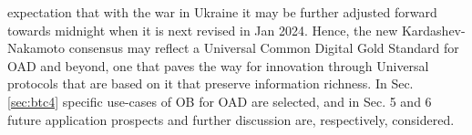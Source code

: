 \documentclass[final,5p,times,twocolumn,authoryear]{elsarticle}
\begin{document}
expectation that with the war in Ukraine it may be further adjusted forward towards midnight when it is next revised in Jan 2024. Hence, the new Kardashev-Nakamoto consensus may reflect a Universal Common Digital Gold Standard for OAD and beyond, one that paves the way for innovation through Universal protocols that are based on it that preserve information richness.  In Sec. \ref{sec:btc4} specific use-cases of OB for OAD are selected, and in Sec. 5 and 6 future application prospects and further discussion are, respectively, considered.



\end{document}
